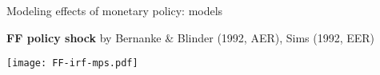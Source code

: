 \documentclass[notes,blackandwhite,mathsans,usenames,dvipsnames]{beamer}
\begin{document}
%
%
%



\begin{frame}{Modeling effects of monetary policy: {\color{purple}models}}

\textbf{FF policy shock}
{\footnotesize \color{mcxs2}by Bernanke \& Blinder (1992, AER), Sims (1992, EER)}

\centering
\texttt{[image: FF-irf-mps.pdf]}

\end{frame}
\end{document}
